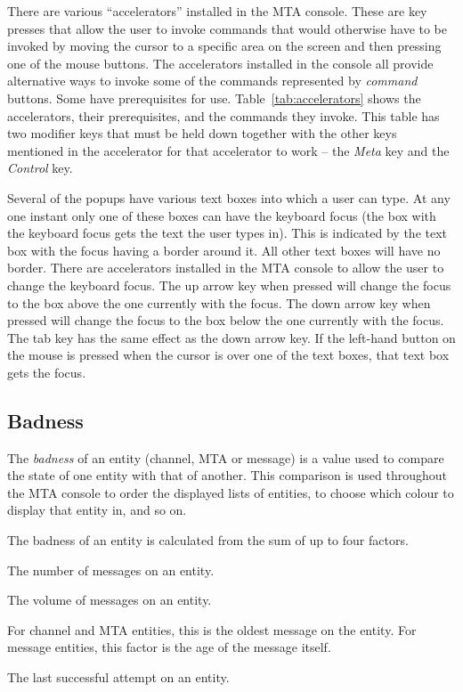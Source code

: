 There are various ``accelerators'' installed in the MTA console.
These are key presses that allow the user to invoke commands that
would otherwise have to be invoked by moving the cursor to a specific
area on the screen and then pressing one of the mouse buttons.  The
accelerators installed in the console all provide alternative ways to
invoke some of the commands represented by {\em command} buttons.
Some have prerequisites for use.  Table~\ref{tab:accelerators} shows
the accelerators, their prerequisites, and the commands they invoke.
This table has two modifier keys that must be held down together with
the other keys mentioned in the accelerator for that accelerator to
work  -- the {\em Meta} key and the {\em Control} key.


Several of the popups have various text boxes into which a user can
type.  At any one instant only one of these boxes can have the
keyboard focus (the box with the keyboard focus gets the text the user
types in).  This is indicated by the text box with the focus having a
border around it.  All other text boxes will have no border.  There
are accelerators installed in the MTA console to allow the user to
change the keyboard focus.  The up arrow key when pressed will change
the focus to the box above the one currently with the focus.  The down
arrow key when pressed will change the focus to the box below the one
currently with the focus.  The tab key has the same effect as the down
arrow key.  If the left-hand button on the mouse is pressed when the
cursor is over one of the text boxes, that text box gets the focus.


\subsection	{Badness} \label{sect:badness}

The {\em badness} of an entity (channel, MTA or message) is a value
used to compare the state of one entity with that of another.
This comparison is used throughout the MTA console to order the
displayed lists of entities, to choose which colour to display that
entity in, and so on.

The badness of an entity is calculated from the sum of up to four
factors.
\begin{describe}
\item [\verb+number+:]	The number of messages on an entity.
\item [\verb+volume+:] The volume of messages on an entity.
\item [\verb+age+:] For channel and MTA entities, this is the oldest
message on the entity. 
For message entities, this factor is the age of the message itself.
\item [\verb+last+:] The last successful attempt on an entity.
\end{describe}

